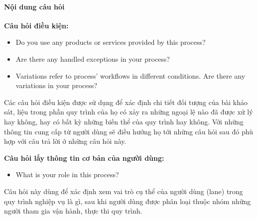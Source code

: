 \paragraph{Nội dung câu hỏi}\mbox{}

\textbf{Câu hỏi điều kiện:}
\begin{itemize}
    \item Do you use any products or services provided by this process?
    \item Are there any handled exceptions in your process?
    \item Variations refer to process’ workflows in different conditions. Are there any variations in your process?
\end{itemize}
\par
Các câu hỏi điều kiện được sử dụng để xác định chi tiết đối tượng của bài khảo sát, liệu trong phần quy trình của họ có xảy ra những ngoại lệ nào đã được xử lý hay không, hay có bất kỳ những biến thể của quy trình hay không. Với những thông tin cung cấp từ người dùng sẽ điều hướng họ tới những câu hỏi sau đó phù hợp với câu trả lời ở những câu hỏi này.

\textbf{Câu hỏi lấy thông tin cơ bản của người dùng:}
\begin{itemize}
    \item What is your role in this process?
\end{itemize}
\par
Câu hỏi này dùng để xác định xem vai trò cụ thể của người dùng (lane) trong quy trình nghiệp vụ là gì, sau khi người dùng được phân loại thuộc nhóm những người tham gia vận hành, thực thi quy trình.

